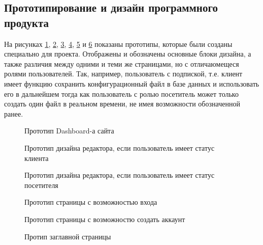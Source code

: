\subsection{Прототипирование и дизайн программного продукта}

На рисунках \ref{des:proto_1}, \ref{des:proto_2}, \ref{des:proto_3}, \ref{des:proto_4}, \ref{des:proto_5} и
\ref{des:proto_6} показаны прототипы, которые были созданы специально для проекта. Отображены и обозначены основные блоки дизайна, а также различия между
одними и теми же страницами, но с отличаюмещеся ролями пользователей. Так, например, пользователь с подпиской, т.е. клиент имеет функцию сохранить конфигурационный файл
в базе данных и использовать его в дальнейшем тогда как пользователь с ролью посетитель может только создать один файл в реальном времени, не имея возможности обозначенной ранее.

\begin{figure}[H]
    \caption{Прототип Dashboard-а сайта}
    \label{des:proto_1}
\end{figure}

\begin{figure}[H]
    \caption{Прототип дизайна редактора, если пользователь имеет статус клиента}
    \label{des:proto_2}
\end{figure}

\begin{figure}[H]
    \caption{Прототип дизайна редактора, если пользователь имеет статус посетителя}
    \label{des:proto_3}
\end{figure}

\begin{figure}[H]
    \caption{Прототип страницы с возможностью входа}
    \label{des:proto_4}
\end{figure}

\begin{figure}[H]
    \caption{Прототип страницы с возможностю создать аккаунт}
    \label{des:proto_5}
\end{figure}

\begin{figure}[H]
    \caption{Протип заглавной страницы}
    \label{des:proto_6}
\end{figure}
